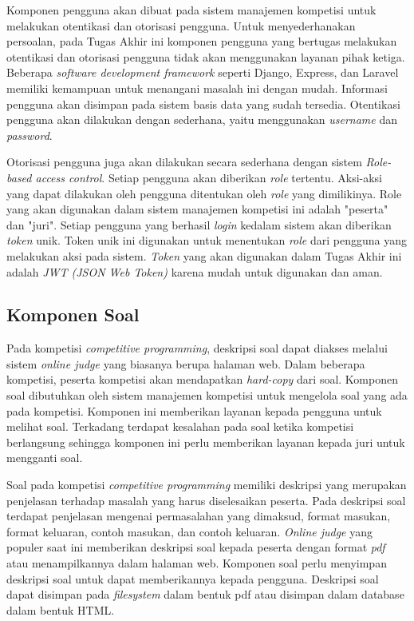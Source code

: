 \par Komponen pengguna akan dibuat pada sistem manajemen kompetisi untuk melakukan otentikasi dan otorisasi pengguna. Untuk menyederhanakan persoalan, pada Tugas Akhir ini komponen pengguna yang bertugas melakukan otentikasi dan otorisasi pengguna tidak akan menggunakan layanan pihak ketiga. Beberapa \textit{software development framework} seperti Django, Express, dan Laravel memiliki kemampuan untuk menangani masalah ini dengan mudah. Informasi pengguna akan disimpan pada sistem basis data yang sudah tersedia. Otentikasi pengguna akan dilakukan dengan sederhana, yaitu menggunakan \textit{username} dan \textit{password}.

\par Otorisasi pengguna juga akan dilakukan secara sederhana dengan sistem \textit{Role-based access control}. Setiap pengguna akan diberikan \textit{role} tertentu. Aksi-aksi yang dapat dilakukan oleh pengguna ditentukan oleh \textit{role} yang dimilikinya. Role yang akan digunakan dalam sistem manajemen kompetisi ini adalah "peserta" dan "juri". Setiap pengguna yang berhasil \textit{login} kedalam sistem akan diberikan \textit{token} unik. Token unik ini digunakan untuk menentukan \textit{role} dari pengguna yang melakukan aksi pada sistem. \textit{Token} yang akan digunakan dalam Tugas Akhir ini adalah \textit{JWT (JSON Web Token)} karena mudah untuk digunakan dan aman.

\subsection{Komponen Soal}

\par Pada kompetisi \textit{competitive programming}, deskripsi soal dapat diakses melalui sistem \textit{online judge} yang biasanya berupa halaman web. Dalam beberapa kompetisi, peserta kompetisi akan mendapatkan \textit{hard-copy} dari soal. Komponen soal dibutuhkan oleh sistem manajemen kompetisi untuk mengelola soal yang ada pada kompetisi. Komponen ini memberikan layanan kepada pengguna untuk melihat soal. Terkadang terdapat kesalahan pada soal ketika kompetisi berlangsung sehingga komponen ini perlu memberikan layanan kepada juri untuk mengganti soal.

\par Soal pada kompetisi \textit{competitive programming} memiliki deskripsi yang merupakan penjelasan terhadap masalah yang harus diselesaikan peserta. Pada deskripsi soal terdapat penjelasan mengenai permasalahan yang dimaksud, format masukan, format keluaran, contoh masukan, dan contoh keluaran. \textit{Online judge} yang populer saat ini memberikan deskripsi soal kepada peserta dengan format \textit{pdf} atau menampilkannya dalam halaman web. Komponen soal perlu menyimpan deskripsi soal untuk dapat memberikannya kepada pengguna. Deskripsi soal dapat disimpan pada \textit{filesystem} dalam bentuk pdf atau disimpan dalam database dalam bentuk HTML.


